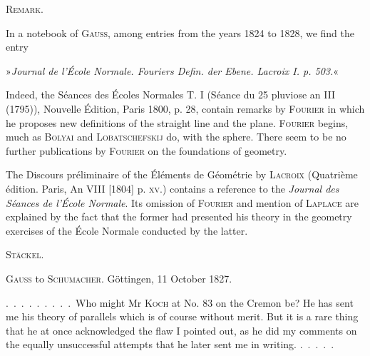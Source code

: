 \begin{center}
\textsc{Remark.}
\end{center}

In a notebook of \textsc{Gauss}, among entries from the
years 1824 to 1828, we find the entry
\begin{center}»\emph{Journal de l'École Normale. Fouriers
Defin. der Ebene. Lacroix I. p. 503.}«\end{center}

Indeed, the Séances des Écoles Normales T. I (Séance du 25
pluviose an III (1795)), Nouvelle Édition, Paris 1800, p. 28, contain remarks
by \textsc{Fourier} in which he proposes new definitions of the straight line and the plane.
\textsc{Fourier} begins, much as \textsc{Bolyai} and
\textsc{Lobatschefskij} do, with the sphere. There seem to be no further publications
by \textsc{Fourier} on the foundations
of geometry.

The Discours préliminaire of the Éléments de Géométrie by \textsc{Lacroix}
(Quatrième édition. Paris, An VIII [1804] p. \textsc{xv}.) contains a reference to
the \emph{Journal des Séances de l'École Normale}. Its omission of
\textsc{Fourier} and mention of \textsc{Laplace} are explained by the fact
that the former had presented his theory in the geometry exercises of the
École Normale conducted by the latter.

\begin{flushright}
\textsc{Stäckel.}
\end{flushright}

\medskip

\begin{center}
\textsc{Gauss} to \textsc{Schumacher}. Göttingen, 11 October 1827.
\end{center}

.\ .\ .\ .\ .\ .\ .\ .\ .\ Who might Mr \textsc{Koch} at No. 83 on the Cremon be? He has
sent me his theory of parallels which is of course without merit. But
it is a rare thing that he at once acknowledged the flaw I pointed out,
as he did my comments on the equally unsuccessful attempts that he later sent me
in writing. .\ .\ .\ .\ .

